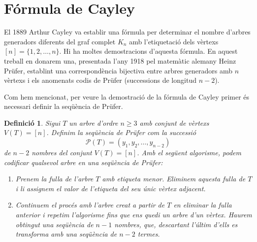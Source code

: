\documentclass{article}
\newtheorem{definition}{Definició}[section]
\begin{document}
\section{Fórmula de Cayley}
El 1889 Arthur Cayley va establir una fórmula per determinar el nombre d'arbres generadors diferents del graf complet $K_n$ amb l'etiquetació dels vèrtexs $[n] = \{1,2,\dots ,n\}$. Hi ha moltes demostracions d'aquesta fórmula. En aquest treball en donarem una, presentada l'any 1918 pel matemàtic alemany Heinz Prüfer, establint una correspondència bijectiva entre arbres generadors amb $n$ vèrtexs i els anomenats codis de Prüfer (successions de longitud $n-2$). \cite{5}\par
Com hem mencionat, per veure la demostració de la fórmula de Cayley primer és necessari definir la seqüència de Prüfer.
\begin{definition}\label{pruf}
Sigui $T$ un arbre d'ordre $n \geq 3$ amb conjunt de vèrtexs $V(T)= [n]$. Definim la seqüència de Prüfer com la successió
$$\mathcal{P}(T)=(y_1,y_2,\ldots,y_{n-2})$$
de $n-2$ nombres del conjunt $V(T)=[n]$. Amb el següent algorisme, podem codificar qualsevol arbre en una seqüència de Prüfer:
\begin{enumerate}
\item Prenem la fulla de l'arbre $T$ amb etiqueta menor. Eliminem aquesta fulla de $T$ i li assignem el valor de l'etiqueta del seu únic vèrtex adjacent.
\item Continuem el procés amb l'arbre creat a partir de $T$ en eliminar la fulla anterior i repetim l'algorisme fins que ens quedi un arbre d'un vèrtex. Haurem obtingut una seqüència de $n-1$ nombres, que, descartant l'últim d'ells es transforma amb una seqüència de $n-2$ termes. \cite{4}
\end{enumerate}
\end{definition}
\end{document}
